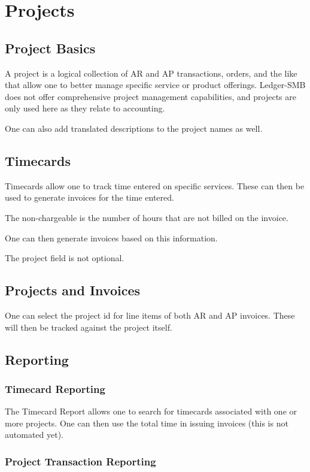 \documentclass{article}
\begin{document}
\section{Projects}
\subsection{Project Basics}
A project is a logical collection of AR and AP transactions, orders, and the
like  that allow one to better manage specific service or product offerings.
Ledger-SMB does not offer comprehensive project management capabilities, and
projects are only used here as they relate to accounting.

One can also add translated descriptions to the project names as well.
 
\subsection{Timecards}
Timecards allow one to track time entered on specific services.  These can then
be used to generate invoices for the time entered.

The non-chargeable is the number of hours that are not billed on the invoice.

One can then generate invoices based on this information.

The project field is not optional.

\subsection{Projects and Invoices}
One can select the project id for line items of both AR and AP invoices.  These
will then be tracked against the project itself.

\subsection{Reporting}
\subsubsection{Timecard Reporting}

The Timecard Report allows one to search for timecards associated with one or
more projects.  One can then use the total time in issuing invoices (this is not
automated yet).

\subsubsection{Project Transaction Reporting}
\end{document}

